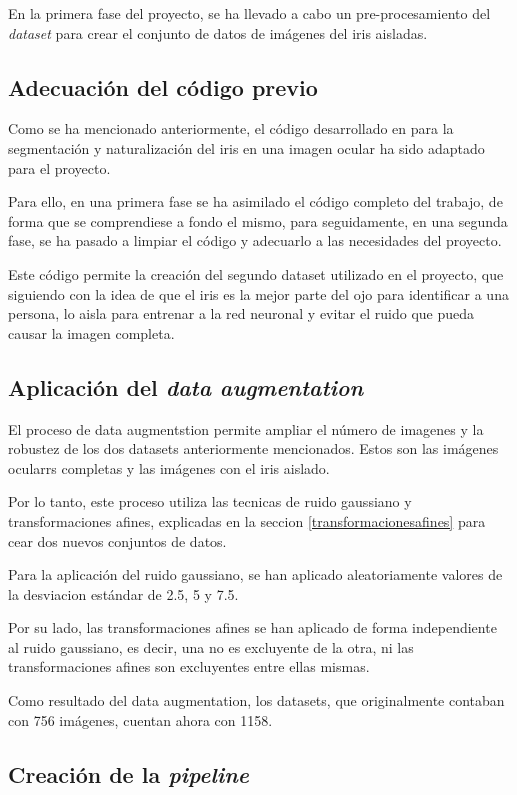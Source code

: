 En la primera fase del proyecto, se ha llevado a cabo un pre-procesamiento del \textit{dataset} para crear el conjunto de datos de imágenes del iris aisladas.

\subsection{Adecuación del código previo}

Como se ha mencionado anteriormente, el código desarrollado en \cite{tfg_iris_2020} para la segmentación y naturalización del iris en una imagen ocular ha sido adaptado para el proyecto. 

Para ello, en una primera fase se ha asimilado el código completo del trabajo, de forma que se comprendiese a fondo el mismo, para seguidamente, en una segunda fase, se ha pasado a limpiar el código y adecuarlo a las necesidades del proyecto. 

Este código permite la creación del segundo dataset utilizado en el proyecto, que siguiendo con la idea de que el iris es la mejor parte del ojo para identificar a una persona, lo aisla para entrenar a la red neuronal y evitar el ruido que pueda causar la imagen completa. 


\subsection{Aplicación del \textit{data augmentation}}

El proceso de data augmentstion permite ampliar el número de imagenes y la robustez de los dos datasets anteriormente mencionados. Estos son las imágenes ocularrs completas y las imágenes con el iris aislado. 

Por lo tanto, este proceso utiliza las tecnicas de ruido gaussiano y transformaciones afines, explicadas en la seccion \ref{transformacionesafines} para cear dos nuevos conjuntos de datos. 

Para la aplicación del ruido gaussiano, se han aplicado aleatoriamente valores de la desviacion estándar de 2.5, 5 y 7.5.

Por su lado, las transformaciones afines se han aplicado de forma independiente al ruido gaussiano, es decir, una no es excluyente de la otra, ni las transformaciones afines son excluyentes entre ellas mismas. 

Como resultado del data augmentation, los datasets, que originalmente contaban con 756 imágenes, cuentan ahora con 1158.

\subsection{Creación de la \textit{pipeline}}

